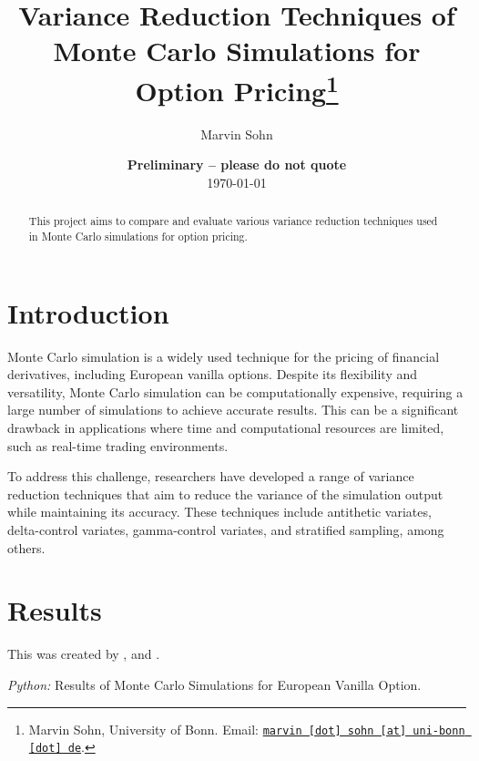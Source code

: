 \documentclass[11pt, a4paper, leqno]{article}
\begin{document}
\title{Variance Reduction Techniques of Monte Carlo Simulations for Option Pricing\thanks{Marvin Sohn, University of Bonn. Email: \href{mailto:marvin.sohn@uni-bonn.de}{\nolinkurl{marvin [dot] sohn [at] uni-bonn [dot] de}}.}}

\author{Marvin Sohn}

\date{
    {\bf Preliminary -- please do not quote}
    \\[1ex]
    \today
}

\maketitle


\begin{abstract}
    This project aims to compare and evaluate various variance reduction techniques used in Monte Carlo simulations for option pricing.
\end{abstract}

\clearpage


\section{Introduction} %
\label{sec:introduction}

Monte Carlo simulation is a widely used technique for the pricing of financial derivatives, including European vanilla options. Despite its flexibility and versatility, Monte Carlo simulation can be computationally expensive, requiring a large number of simulations to achieve accurate results. This can be a significant drawback in applications where time and computational resources are limited, such as real-time trading environments.

To address this challenge, researchers have developed a range of variance reduction techniques that aim to reduce the variance of the simulation output while maintaining its accuracy. These techniques include antithetic variates, delta-control variates, gamma-control variates, and stratified sampling, among others.

\section{Results}\label{sec:results}


This was created by \cite{Glassermann:2004}, \cite{Hilpisch:2015} and \cite{Clewlow:1998}.

\begin{table}[!h]
    
    \caption{\label{tab:results}\emph{Python:} Results of Monte Carlo Simulations for European Vanilla Option.}
\end{table}





\printbibliography
{}



\end{document}
